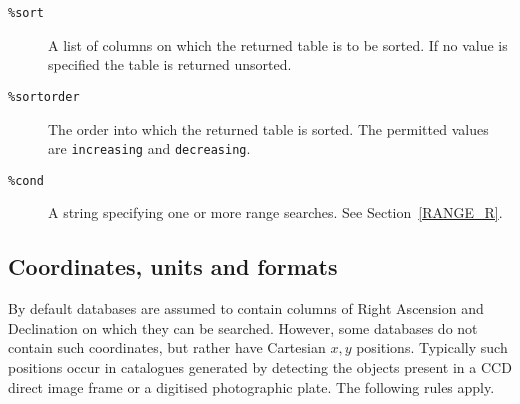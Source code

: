 \documentclass[twoside,11pt,nolof,chapters]{starlink}
\begin{document}
\begin{description}
  \item[\texttt{\%sort}] A list of columns on which the returned table is
   to be sorted.  If no value is specified the table is returned unsorted.

  \item[\texttt{\%sortorder}] The order into which the returned table is
   sorted.  The permitted values are \texttt{increasing} and \texttt{decreasing}.

  \item[\texttt{\%cond}] A string specifying one or more range searches.
   See Section~\ref{RANGE_R}.

\end{description}

\subsection{\label{CUF_R}Coordinates, units and formats}

By default databases are assumed to contain columns of Right Ascension
and Declination on which they can be searched.  However, some databases
do not contain such coordinates, but rather have Cartesian $x,y$\/
positions.  Typically such positions occur in catalogues generated
by detecting the objects present in a CCD direct image frame or a
digitised photographic plate.  The following rules apply.
\end{document}
